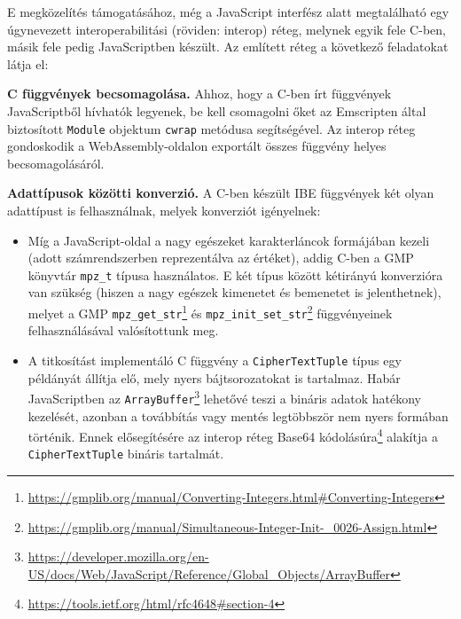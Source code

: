 E megközelítés támogatásához, még a JavaScript interfész alatt megtalálható egy úgynevezett interoperabilitási (röviden: interop) réteg, melynek egyik fele C-ben, másik fele pedig JavaScriptben készült. Az említett réteg a következő feladatokat látja el:

\begin{outdentlist}
    \item[]\textbf{C függvények becsomagolása.}
    Ahhoz, hogy a C-ben írt függvények JavaScriptből hívhatók legyenek, be kell csomagolni őket az Emscripten által biztosított \texttt{Module} objektum \texttt{cwrap} metódusa segítségével. Az interop réteg gondoskodik a WebAssembly-oldalon exportált összes függvény helyes becsomagolásáról.

    \item[]\textbf{Adattípusok közötti konverzió.}
    A C-ben készült IBE függvények két olyan adattípust is felhasználnak, melyek konverziót igényelnek:

    \begin{itemize}
        \item
        Míg a JavaScript-oldal a nagy egészeket karakterláncok formájában kezeli (adott számrendszerben reprezentálva az értéket), addig C-ben a GMP könyvtár \texttt{mpz\_t} típusa használatos. E két típus között kétirányú konverzióra van szükség (hiszen a nagy egészek kimenetet és bemenetet is jelenthetnek), melyet a GMP \texttt{mpz\_get\_str}\footnote{\url{https://gmplib.org/manual/Converting-Integers.html#Converting-Integers}} és \texttt{mpz\_init\_set\_str}\footnote{\url{https://gmplib.org/manual/Simultaneous-Integer-Init-_0026-Assign.html}} függvényeinek felhasználásával valósítottunk meg.

        \item
        A titkosítást implementáló C függvény a \texttt{CipherTextTuple} típus egy példányát állítja elő, mely nyers bájtsorozatokat is tartalmaz. Habár JavaScriptben az \texttt{ArrayBuffer}\footnote{\url{https://developer.mozilla.org/en-US/docs/Web/JavaScript/Reference/Global_Objects/ArrayBuffer}} lehetővé teszi a bináris adatok hatékony kezelését, azonban a továbbítás vagy mentés legtöbbször nem nyers formában történik. Ennek elősegítésére az interop réteg Base64 kódolásúra\footnote{\url{https://tools.ietf.org/html/rfc4648#section-4}} alakítja a \texttt{CipherTextTuple} bináris tartalmát.
    \end{itemize}


\end{outdentlist}
